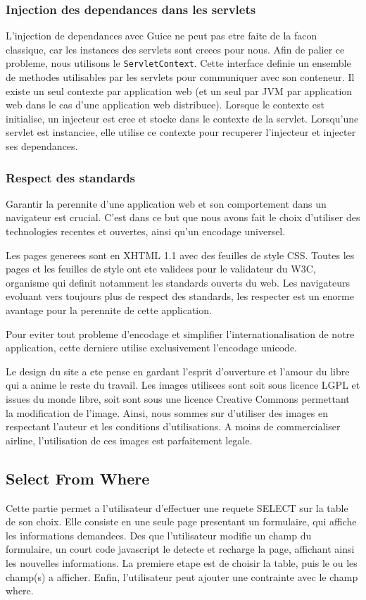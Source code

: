 \subsubsection{Injection des dependances dans les servlets}
L'injection de dependances avec Guice ne peut pas etre faite de la facon classique, car les instances des servlets sont creees pour nous. Afin de palier ce probleme, nous utilisons le \verb|ServletContext|. Cette  interface definie un ensemble de methodes utilisables par les servlets pour communiquer avec son conteneur. Il existe un seul contexte par application web (et un seul par JVM par application web dans le cas d'une application web distribuee). Lorsque le contexte est initialise, un injecteur est cree et stocke dans le contexte de la servlet. Lorsqu'une servlet est instanciee, elle utilise ce contexte pour recuperer l'injecteur et injecter ses dependances.

\subsubsection{Respect des standards}
Garantir la perennite d'une application web et son comportement dans un navigateur est crucial. C'est dans ce but que nous avons fait le choix d'utiliser des technologies recentes et ouvertes, ainsi qu'un encodage universel.

Les pages generees sont en XHTML 1.1 avec des feuilles de style CSS. Toutes les pages et les feuilles de style ont ete validees pour le validateur du W3C, organisme qui definit notamment les standards ouverts du web. Les navigateurs evoluant vers toujours plus de respect des standards, les respecter est un enorme avantage pour la perennite de cette application.

Pour eviter tout probleme d'encodage et simplifier l'internationalisation de notre application, cette derniere utilise exclusivement l'encodage unicode.

Le design du site a ete pense en gardant l'esprit d'ouverture et l'amour du libre qui a anime le reste du travail. Les images utilisees sont soit sous licence LGPL et issues du monde libre, soit sont sous une licence Creative Commons permettant la modification de l'image. Ainsi, nous sommes sur d'utiliser des images en respectant l'auteur et les conditions d'utilisations. A moins de commercialiser airline, l'utilisation de ces images est parfaitement legale.

\subsection{Select From Where}
Cette partie permet a l'utilisateur d'effectuer une requete SELECT sur la table de son choix. Elle consiste en une seule page presentant un formulaire, qui affiche les informations demandees. Des que l'utilisateur modifie un champ du formulaire, un court code javascript le detecte et recharge la page, affichant ainsi les nouvelles informations. La premiere etape est de choisir la table, puis le ou les champ(s) a afficher. Enfin, l'utilisateur peut ajouter une contrainte avec le champ where.

